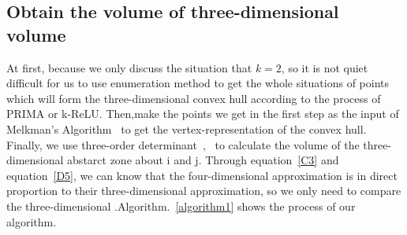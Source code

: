 \documentclass[runningheads]{llncs}
\begin{document}
\subsection{Obtain the volume of three-dimensional volume}

At first, because we only discuss the situation that $k=2$, so it is not quiet difficult for us to use enumeration method to get the whole situations of points which will form the three-dimensional convex hull according to the process of PRIMA or k-ReLU. Then,make the points we get in the first step as the input of  Melkman's Algorithm~\cite{ref_url2} to get the vertex-representation of the convex hull. Finally, we use three-order determinant~\cite{ref_article1},~\cite{ref_article4} to calculate the volume of the three-dimensional abstarct zone about i and j. Through equation~\ref{C3} and equation~\ref{D5}, we can know that the four-dimensional approximation is in direct proportion to their three-dimensional approximation, so we only need to compare the three-dimensional .Algorithm.~\ref{algorithm1} shows the process of our algorithm.
\end{document}
